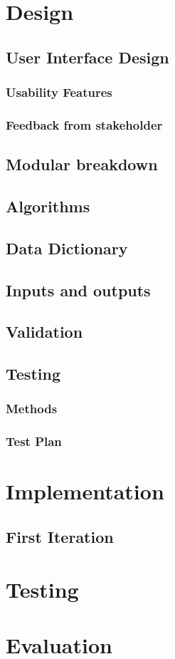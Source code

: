 \documentclass{article}
\begin{document}
\section{Design}

\subsection{User Interface Design}

\subsubsection{Usability Features}

\subsubsection{Feedback from stakeholder}

\subsection{Modular breakdown}

\subsection{Algorithms}

\subsection{Data Dictionary}

\subsection{Inputs and outputs}

\subsection{Validation}

\subsection{Testing}

\subsubsection{Methods}

\subsubsection{Test Plan}

\section{Implementation}

\subsection{First Iteration}

\section{Testing}

\section{Evaluation}
\end{document}
